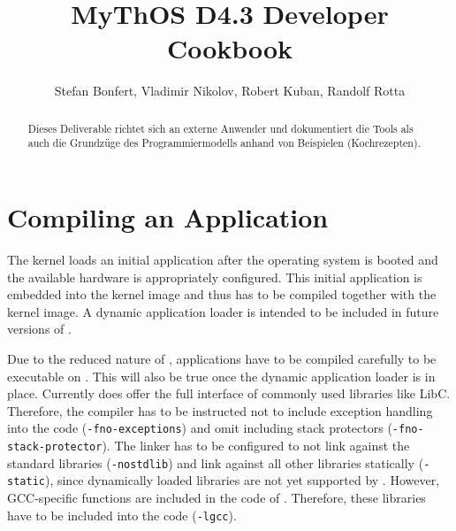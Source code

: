 

\title{MyThOS D4.3 Developer Cookbook}
\author{Stefan Bonfert, Vladimir Nikolov, Robert Kuban, Randolf Rotta}



\maketitle

\begin{abstract} 

Dieses Deliverable richtet sich an externe Anwender und
dokumentiert die Tools als auch die Grundz\"uge des Programmiermodells anhand von
Beispielen (Kochrezepten).  

\end{abstract}

\newpage
\tableofcontents

\section{Compiling an Application}

The \mythos kernel loads an initial application after the operating system is booted and the available hardware is appropriately configured. This initial application is embedded into the kernel image and thus has to be compiled together with the kernel image. A dynamic application loader is intended to be included in future versions of \mythos.

Due to  the reduced nature of \mythos, applications have to be compiled carefully to be executable on \mythos. This will also be true once the dynamic application loader is in place. Currently \mythos does offer the full interface of commonly used libraries like LibC. Therefore, the compiler has to be instructed not to include exception handling into the code (\texttt{-fno-exceptions}) and omit including stack protectors (\texttt{-fno-stack-protector}). The linker has to be configured to not link against the standard libraries (\texttt{-nostdlib}) and link against all other libraries statically (\texttt{-static}), since dynamically loaded libraries are not yet supported by \mythos. However, GCC-specific functions are included in the code of \mythos. Therefore, these libraries have to be included into the code (\texttt{-lgcc}).

